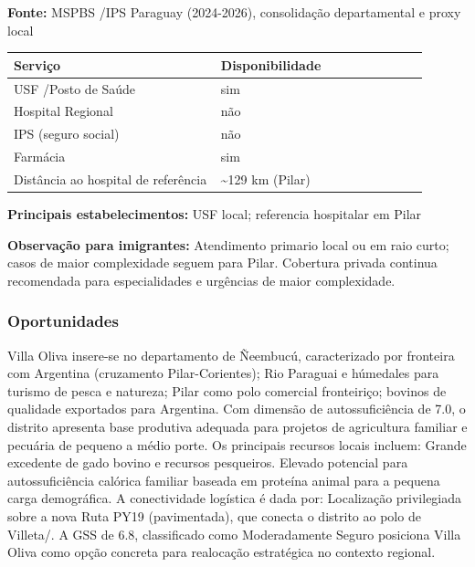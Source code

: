 \textbf{Fonte:} MSPBS /\allowbreak  IPS Paraguay (2024-2026), consolidação
departamental e proxy local

{\def\LTcaptype{none} %
\begin{longtable}{@{}>{\raggedright\arraybackslash}p{0.45\linewidth} >{\raggedright\arraybackslash}p{0.45\linewidth}@{}}
\toprule\noalign{}
Serviço & Disponibilidade \\
\midrule\noalign{}
\endhead
\bottomrule\noalign{}
\endlastfoot
USF /\allowbreak  Posto de Saúde & sim \\
Hospital Regional & não \\
IPS (seguro social) & não \\
Farmácia & sim \\
Distância ao hospital de referência & \textasciitilde129 km (Pilar) \\
\end{longtable}
}

\textbf{Principais estabelecimentos:} USF local; referencia hospitalar
em Pilar

\textbf{Observação para imigrantes:} Atendimento primario local ou em
raio curto; casos de maior complexidade seguem para Pilar. Cobertura
privada continua recomendada para especialidades e urgências de maior
complexidade.
\newpage

\subsubsection*{Oportunidades}\label{oport-villa-oliva-1215}
Villa Oliva insere-se no departamento de Ñeembucú, caracterizado por fronteira com Argentina (cruzamento Pilar-Corientes); Rio Paraguai e húmedales para turismo de pesca e natureza; Pilar como polo comercial fronteiriço; bovinos de qualidade exportados para Argentina. Com dimensão de autossuficiência de 7.0, o distrito apresenta base produtiva adequada para projetos de agricultura familiar e pecuária de pequeno a médio porte. Os principais recursos locais incluem: Grande excedente de gado bovino e recursos pesqueiros. Elevado potencial para autossuficiência calórica familiar baseada em proteína animal para a pequena carga demográfica. A conectividade logística é dada por: Localização privilegiada sobre a nova Ruta PY19 (pavimentada), que conecta o distrito ao polo de Villeta/. A GSS de 6.8, classificado como Moderadamente Seguro posiciona Villa Oliva como opção concreta para realocação estratégica no contexto regional.

